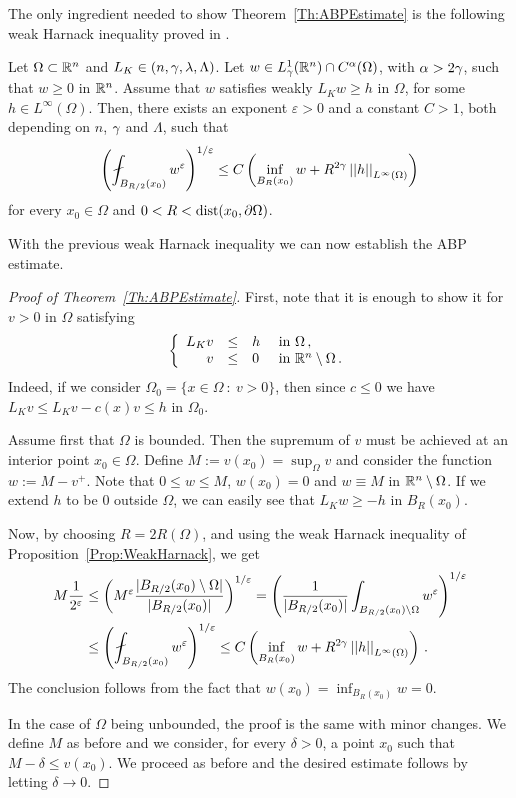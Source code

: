The only ingredient needed to show Theorem~\ref{Th:ABPEstimate} is the following weak Harnack inequality proved in  \cite{Cozzi-DeGiorgiClassesShort}.

\begin{proposition}
	
	\label{Prop:WeakHarnack}
		
	Let $\Omega \subset \mathbb{R}^n$ and $L_K\in (n,\gamma,\lambda, \Lambda)$. Let $w \in L^1_\gamma(\mathbb{R}^n)\cap C^{\alpha}(\Omega)$, with $\alpha > 2\gamma$, such that $w\geq 0$ in $\mathbb{R}^n$. Assume that $w$ satisfies weakly $L_K w \geq h$ in $\Omega$, for some $h\in L^\infty (\Omega)$. Then, there exists an exponent $\varepsilon > 0 $  and a constant $C > 1$, both depending on $n$, $\gamma$ and $\Lambda$, such that
	$$
	 \bpar{ \fint_{B_{R/2}(x_0)} w^\varepsilon}^{1/\varepsilon} \leq C \bpar{\inf_{B_{R}(x_0)} w + R^{2\s} \norm{h}_{L^{\infty}(\Omega)} }
	$$
	for every $x_0\in \Omega$ and $0<R<\operatorname{dist}(x_0, \partial \Omega)$.
\end{proposition}

With the previous weak Harnack inequality we can now establish the ABP estimate.

\begin{proof}[Proof of Theorem~\ref{Th:ABPEstimate}]
	First, note that it is enough to show it for $v > 0$ in $\Omega$ satisfying
	$$
	\left\{\begin{array}{rcll}
	L_K v &\leq & h & \text{ in } \Omega\,, \\
	v & \leq & 0 & \text{ in } \mathbb{R}^n\setminus \Omega\,.
	\end{array} \right.
	$$
	Indeed, if we consider $\Omega_0 = \{x \in \Omega \ : \ v > 0\}$, then since $c \leq 0$ we have $L_K v \leq L_K v - c(x)v \leq h$ in $\Omega_0$.
	
	Assume first that $\Omega$ is bounded. Then the supremum of $v$ must be achieved at an interior point $x_0\in \Omega$. Define	$M:= v(x_0) = \sup_\Omega v$ and consider the function $w := M - v^+$. Note that $0 \leq w \leq M$, $w(x_0) = 0$ and $w \equiv M$ in $\mathbb{R}^n \setminus \Omega$. If we extend $h$ to be $0$ outside $\Omega$, we can easily see that $L_K w \geq -h$ in $B_R(x_0)$.
	
	Now, by choosing $R= 2R(\Omega)$, and using the weak Harnack inequality of Proposition~\ref{Prop:WeakHarnack}, we get
	\begin{align*}
	M \dfrac{1}{2^\varepsilon} & \leq \bpar{M^{\varepsilon}\dfrac{|B_{R/2}(x_0)\setminus \Omega|}{|B_{R/2}(x_0)|}}^{1/\varepsilon}= \bpar{\dfrac{1}{|B_{R/2}(x_0)|} \int_{B_{R/2}(x_0)\setminus \Omega} w^\varepsilon}^{1/\varepsilon} \\
	& \leq \bpar{ \fint_{B_{R/2}(x_0)} w^\varepsilon}^{1/\varepsilon} \leq C \bpar{\inf_{B_{R}(x_0)} w + R^{2\s} \norm{h}_{L^{\infty}(\Omega)} }\,.
	\end{align*}
	The conclusion follows from the fact that $w(x_0)= \inf_{B_{R}(x_0)} w = 0$.
	
	In the case of $\Omega$ being unbounded, the proof is the same with minor changes. We define $M$ as before and we consider, for every $\delta > 0$, a point $x_0$ such that $M-\delta \leq v(x_0)$. We proceed as before and the desired estimate follows by letting $\delta \to 0$.
\end{proof}

